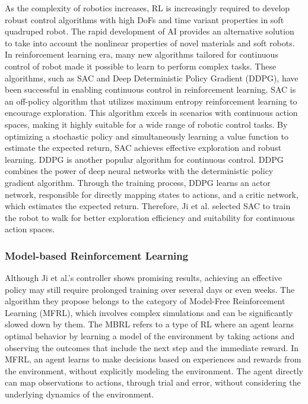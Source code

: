 As the complexity of robotics increases, \ac{RL} is increasingly required to develop robust control algorithms with high \ac{DoF}s and time variant properties\cite{zhangEffectiveSoftRobot2017} in soft quadruped robot. The rapid development of AI provides an alternative solution to take into account the nonlinear properties of novel materials and soft robots\cite{tangModelbasedOnlineLearning2021}. In reinforcement learning era, many new algorithms tailored for continuous control of robot made it possible to learn to perform complex tasks. These algorithms, such as \ac{SAC}\cite{haarnojaSoftActorCriticOffPolicy2018} and Deep Deterministic Policy Gradient (DDPG)\cite{silverDeterministicPolicyGradient2014}, have been successful in enabling continuous control in reinforcement learning\cite{haarnojaLearningWalkDeep2019, pengSimtoRealTransferRobotic2018}. SAC is an off-policy algorithm that utilizes maximum entropy reinforcement learning to encourage exploration. This algorithm excels in scenarios with continuous action spaces, making it highly suitable for a wide range of robotic control tasks. By optimizing a stochastic policy and simultaneously learning a value function to estimate the expected return, SAC achieves effective exploration and robust learning. DDPG is another popular algorithm for continuous control. DDPG combines the power of deep neural networks with the deterministic policy gradient algorithm. Through the training process, DDPG learns an actor network, responsible for directly mapping states to actions, and a critic network, which estimates the expected return. Therefore, Ji et al. \cite{jiSynthesizingOptimalGait2022} selected \ac{SAC} to train the robot to walk for better exploration efficiency and suitability for continuous action spaces.

\subsubsection{Model-based Reinforcement Learning}
Although Ji et al.'s controller shows promising results, achieving an effective policy may still require prolonged training over several days or even weeks. The algorithm they propose belongs to the category of Model-Free Reinforcement Learning (MFRL), which involves complex simulations and can be significantly slowed down by them. The \ac{MBRL} refers to a type of \ac{RL} where an agent learns optimal behavior by learning a model of the environment by taking actions and observing the outcomes that include the next step and the immediate reward. In \ac{MFRL}, an agent learns to make decisions based on experiences and rewards from the environment, without explicitly modeling the environment. The agent directly can map observations to actions, through trial and error, without considering the underlying dynamics of the environment.


